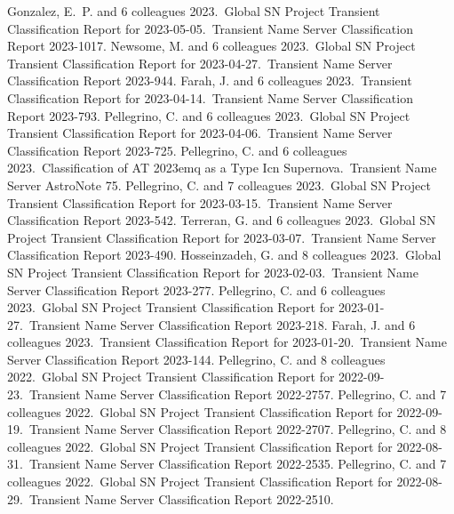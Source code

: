 \documentclass[margin,line]{res}
\begin{document}
\begin{resume}
 Gonzalez, E.~P. and 6 colleagues 2023.\ Global SN Project Transient Classification Report for 2023-05-05.\ Transient Name Server Classification Report 2023-1017.
 Newsome, M. and 6 colleagues 2023.\ Global SN Project Transient Classification Report for 2023-04-27.\ Transient Name Server Classification Report 2023-944.
 Farah, J. and 6 colleagues 2023.\ Transient Classification Report for 2023-04-14.\ Transient Name Server Classification Report 2023-793.
 Pellegrino, C. and 6 colleagues 2023.\ Global SN Project Transient Classification Report for 2023-04-06.\ Transient Name Server Classification Report 2023-725.
 Pellegrino, C. and 6 colleagues 2023.\ Classification of AT 2023emq as a Type Icn Supernova.\ Transient Name Server AstroNote 75.
 Pellegrino, C. and 7 colleagues 2023.\ Global SN Project Transient Classification Report for 2023-03-15.\ Transient Name Server Classification Report 2023-542.
 Terreran, G. and 6 colleagues 2023.\ Global SN Project Transient Classification Report for 2023-03-07.\ Transient Name Server Classification Report 2023-490.
 Hosseinzadeh, G. and 8 colleagues 2023.\ Global SN Project Transient Classification Report for 2023-02-03.\ Transient Name Server Classification Report 2023-277.
 Pellegrino, C. and 6 colleagues 2023.\ Global SN Project Transient Classification Report for 2023-01-27.\ Transient Name Server Classification Report 2023-218.
 Farah, J. and 6 colleagues 2023.\ Transient Classification Report for 2023-01-20.\ Transient Name Server Classification Report 2023-144.
 Pellegrino, C. and 8 colleagues 2022.\ Global SN Project Transient Classification Report for 2022-09-23.\ Transient Name Server Classification Report 2022-2757.
 Pellegrino, C. and 7 colleagues 2022.\ Global SN Project Transient Classification Report for 2022-09-19.\ Transient Name Server Classification Report 2022-2707.
 Pellegrino, C. and 8 colleagues 2022.\ Global SN Project Transient Classification Report for 2022-08-31.\ Transient Name Server Classification Report 2022-2535.
 Pellegrino, C. and 7 colleagues 2022.\ Global SN Project Transient Classification Report for 2022-08-29.\ Transient Name Server Classification Report 2022-2510.


\end{resume}
\end{document}
